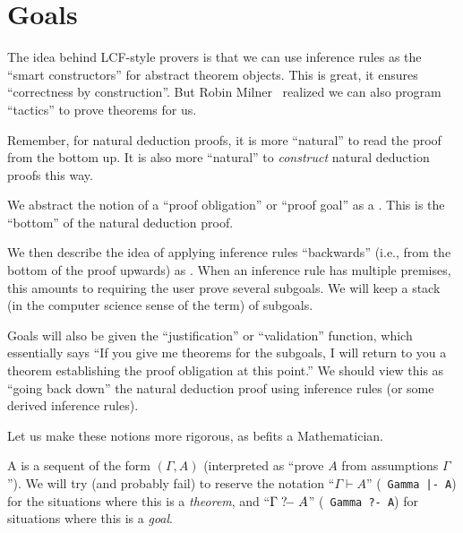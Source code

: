 
\section{Goals}

\begin{node}
The idea behind LCF-style provers is that we can use
inference rules as the ``smart constructors'' for abstract theorem
objects. This is great, it ensures ``correctness by construction''.
But Robin Milner~\cite{milner1984use} realized we can also program ``tactics'' to prove theorems for us.

Remember, for natural deduction proofs, it is more ``natural'' to read
the proof from the bottom up. It is also more ``natural'' to
\emph{construct} natural deduction proofs this way.

We abstract the notion of a ``proof obligation'' or ``proof goal'' as
a . This is the ``bottom'' of the natural deduction
proof. 

We then describe the idea of applying inference rules ``backwards''
(i.e., from the bottom of the proof upwards) as . When
an inference rule has multiple premises, this amounts to requiring the
user prove several subgoals. We will keep a stack (in the computer
science sense of the term) of subgoals.

Goals will also be given the ``justification'' or ``validation'' function, which
essentially says ``If you give me theorems for the subgoals, I will
return to you a theorem establishing the proof obligation at this point.''
We should view this as ``going back down'' the natural deduction proof
using inference rules (or some derived inference rules).

Let us make these notions more rigorous, as befits a Mathematician.
\end{node}

\begin{definition}
A  is a sequent of the form $(\Gamma,A)$ (interpreted as
``prove $A$ from assumptions $\Gamma$''). We will try (and probably
fail) to reserve the notation ``$\Gamma\vdash A$'' (\ASCII\
\texttt{Gamma |- A}) for the situations
where this is a \emph{theorem}, and ``$\Gamma\mathrel{?\!-} A$'' (\ASCII\
\texttt{Gamma ?- A}) for
situations where this is a \emph{goal}.
\end{definition}

